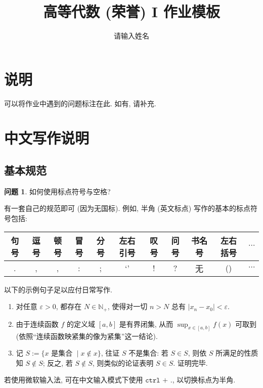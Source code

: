 \documentclass[11pt]{ctexart}
\title{高等代数 (荣誉) I 作业模板}
\author{请输入姓名}
\theoremstyle{definition}
\newtheorem{qqq}{问题}[section]
\numberwithin{equation}{section}
\begin{document}
\maketitle

\section{说明}

可以将作业中遇到的问题标注在此. 如有, 请补充.

\tableofcontents

\newpage


\section{中文写作说明}

\subsection{基本规范}

\begin{qqq}
    如何使用标点符号与空格?
    \begin{aaa}
        有一套自己的规范即可 (因为无国标). 例如, 半角 (英文标点) 写作的基本的标点符号包括:
        \begin{table}[h]
            \begin{tabular}{|c|c|c|c|c|c|c|c|c|c|c|}
                \hline
                句号 & 逗号 & 顿号 & 冒号 & 分号 & 左右引号 & 叹号 & 问号 & 书名号 & 左右括号 & $\cdots $ \\ \hline
                .    & ,    & ,    & :    & ;    & `'       & !    & ?    & 无     & ()       & $\cdots $ \\ \hline
            \end{tabular}
        \end{table}

        以下的示例句子足以应付日常写作.
        \begin{enumerate}
            \item 对任意 $\varepsilon >0$, 都存在 $N\in \mathbb N_+$, 使得对一切 $n >N$ 总有 $|x_n-x_0|< \varepsilon$.
            \item 由于连续函数 $f$ 的定义域 $[a,b]$ 是有界闭集, 从而 $\sup_{x\in [a,b]} f(x)$ 可取到 (依照``连续函数映紧集的像为紧集''这一结论).
            \item 记 $S:=\{x\text{ 是集合 }\mid x\notin x\}$, 往证 $S$ 不是集合: 若 $S\in S$, 则依 $S$ 所满足的性质知 $S\notin S$; 反之, 若 $S\notin S$, 则类似的论证表明 $S\in S$. 证明完毕.
        \end{enumerate}
        \begin{pinked}
            若使用微软输入法, 可在中文输入模式下使用 $\texttt{ctrl + .}$, 以切换标点为半角.
        \end{pinked}
    \end{aaa}
\end{qqq}
\end{document}
